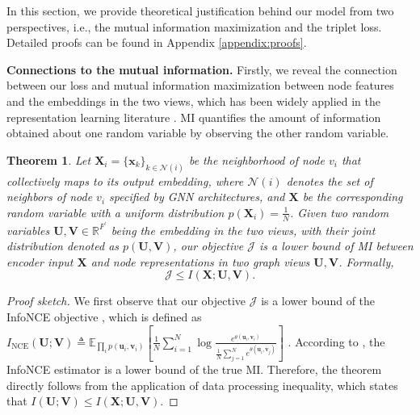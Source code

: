 \documentclass{article}
\newtheorem{theorem}{Theorem}[section]
\theoremstyle{remark}
\begin{document}
In this section, we provide theoretical justification behind our model from two perspectives, i.e., the mutual information maximization and the triplet loss. Detailed proofs can be found in Appendix \ref{appendix:proofs}.

\textbf{Connections to the mutual information.\quad}
Firstly, we reveal the connection between our loss and mutual information maximization between node features and the embeddings in the two views, which has been widely applied in the representation learning literature \cite{Tian:2019vw,Bachman:2019wp,Poole:2019vk,Tschannen:2020uo}. MI quantifies the amount of information obtained about one random variable by observing the other random variable.




\begin{theorem}
\label{thm:objective-InfoMax}
Let \(\mathbf{X}_i = \{ \bm{x}_k \}_{k \in \mathcal{N}(i)}\) be the neighborhood of node \(v_i\) that collectively maps to its output embedding, where \(\mathcal{N}(i)\) denotes the set of neighbors of node \(v_i\) specified by GNN architectures, and \(\mathbf{X}\) be the corresponding random variable with a uniform distribution \(p(\mathbf{X}_i) = \frac{1}{N}\). Given two random variables \(\mathbf{U, V} \in \mathbb{R}^{F^\prime}\) being the embedding in the two views, with their joint distribution denoted as \(p(\mathbf{U}, \mathbf{V})\), our objective \(\mathcal{J}\) is a lower bound of MI between encoder input \(\mathbf{X}\) and node representations in two graph views \(\mathbf{U, V}\). Formally,
\begin{equation}
	\mathcal{J} \leq I(\mathbf{X}; \mathbf{U}, \mathbf{V}).
\end{equation}
\end{theorem}
\begin{proof}[Proof sketch]
We first observe that our objective \(\mathcal{J}\) is a lower bound of the InfoNCE objective \cite{vandenOord:2018ut}, which is defined as \(I_\text{NCE}(\mathbf U; \mathbf V) \triangleq \mathbb{E}_{\prod_i {p(\bm u_i, \bm v_i)}} \left[ \frac{1}{N} \sum_{i=1}^N \log \frac{e^{\theta(\bm{u}_i, \bm{v}_i)}}{\frac{1}{N}\sum_{j = 1}^{N} e^{\theta(\bm{u}_i, \bm{v}_j)}} \right] \) \cite{Poole:2019vk}. According to \cite{vandenOord:2018ut}, the InfoNCE estimator is a lower bound of the true MI. Therefore, the theorem directly follows from the application of data processing inequality, which states that \(I(\mathbf U; \mathbf V) \leq I(\mathbf X; \mathbf U, \mathbf V)\).
\end{proof}
\end{document}
